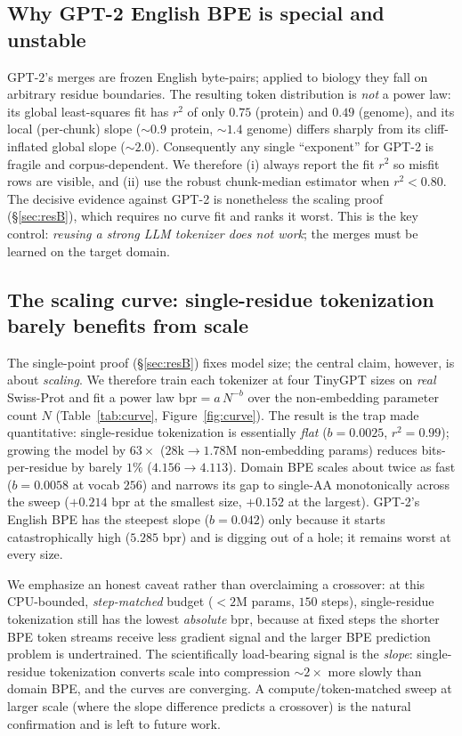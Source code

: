 \documentclass[11pt]{article}
\begin{document}
\subsection{Why GPT-2 English BPE is special and unstable}
\label{sec:gpt2}
GPT-2's merges are frozen English byte-pairs; applied to biology they fall on
arbitrary residue boundaries. The resulting token distribution is \emph{not} a
power law: its global least-squares fit has $r^2$ of only $0.75$ (protein) and
$0.49$ (genome), and its local (per-chunk) slope ($\sim\!0.9$ protein,
$\sim\!1.4$ genome) differs sharply from its cliff-inflated global slope
($\sim\!2.0$). Consequently any single ``exponent'' for GPT-2 is fragile and
corpus-dependent. We therefore (i) always report the fit $r^2$ so misfit rows are
visible, and (ii) use the robust chunk-median estimator when $r^2<0.80$. The
decisive evidence against GPT-2 is nonetheless the scaling proof
(\S\ref{sec:resB}), which requires no curve fit and ranks it worst. This is the
key control: \emph{reusing a strong LLM tokenizer does not work}; the merges must
be learned on the target domain.

\subsection{The scaling curve: single-residue tokenization barely benefits from scale}
\label{sec:curve}
The single-point proof (\S\ref{sec:resB}) fixes model size; the central claim,
however, is about \emph{scaling}. We therefore train each tokenizer at four
TinyGPT sizes on \emph{real} Swiss-Prot and fit a power law
$\text{bpr}=a\,N^{-b}$ over the non-embedding parameter count $N$
(Table~\ref{tab:curve}, Figure~\ref{fig:curve}). The result is the trap made
quantitative: single-residue tokenization is essentially \emph{flat}
($b=0.0025$, $r^2=0.99$); growing the model by $63\times$ ($28$k$\to$$1.78$M
non-embedding params) reduces bits-per-residue by barely $1\%$
($4.156\to4.113$). Domain BPE scales about twice as fast ($b=0.0058$ at vocab
$256$) and narrows its gap to single-AA monotonically across the sweep
($+0.214$ bpr at the smallest size, $+0.152$ at the largest). GPT-2's English BPE
has the steepest slope ($b=0.042$) only because it starts catastrophically high
($5.285$ bpr) and is digging out of a hole; it remains worst at every size.

We emphasize an honest caveat rather than overclaiming a crossover: at this
CPU-bounded, \emph{step-matched} budget ($<\!2$M params, $150$ steps),
single-residue tokenization still has the lowest \emph{absolute} bpr, because at
fixed steps the shorter BPE token streams receive less gradient signal and the
larger BPE prediction problem is undertrained. The scientifically load-bearing
signal is the \emph{slope}: single-residue tokenization converts scale into
compression $\sim\!2\times$ more slowly than domain BPE, and the curves are
converging. A compute/token-matched sweep at larger scale (where the slope
difference predicts a crossover) is the natural confirmation and is left to
future work.
\end{document}
